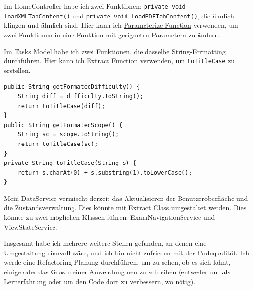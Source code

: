 \documentclass[a4paper]{article}
\begin{document}
Im HomeController habe ich zwei Funktionen: \lstinline|private void loadXMLTabContent()| und \lstinline|private void loadPDFTabContent()|, die ähnlich klingen und ähnlich sind. Hier kann ich \href{https://refactoring.com/catalog/parameterizeFunction.html}{Parameterize Function} verwenden, um zwei Funktionen in eine Funktion mit geeigneten Parametern zu ändern.

Im Tasks Model habe ich zwei Funktionen, die dasselbe String-Formatting durchführen. Hier kann ich \href{https://refactoring.com/catalog/extractFunction.html}{Extract Function} verwenden, um \lstinline|toTitleCase| zu erstellen.

\begin{lstlisting}[style=javastyle]
public String getFormatedDifficulty() {
    String diff = difficulty.toString();
    return toTitleCase(diff);
}
public String getFormatedScope() {
    String sc = scope.toString();
    return toTitleCase(sc);
}
private String toTitleCase(String s) {
    return s.charAt(0) + s.substring(1).toLowerCase();
}
\end{lstlisting}

Mein DataService vermischt derzeit das Aktualisieren der Benutzeroberfläche und die Zustandsverwaltung. Dies könnte mit \href{https://refactoring.com/catalog/extractClass.html}{Extract Class} umgestaltet werden. Dies könnte zu zwei möglichen Klassen führen: ExamNavigationService und ViewStateService.

Insgesamt habe ich mehrere weitere Stellen gefunden, an denen eine Umgestaltung sinnvoll wäre, und ich bin nicht zufrieden mit der Codequalität. Ich werde eine Refactoring-Planung durchführen, um zu sehen, ob es sich lohnt, einige oder das Gros meiner Anwendung neu zu schreiben (entweder nur als Lernerfahrung oder um den Code dort zu verbessern, wo nötig).
\end{document}
